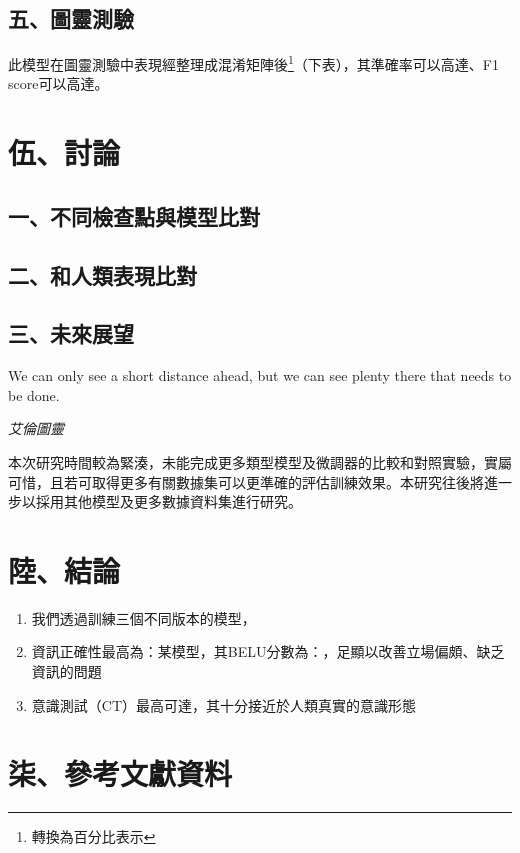 \documentclass[8pt,a4paper,新細明體,UTF8,natbib]{article}
\begin{document}
\begin{CJK*}{UTF8}{bsmi}
	\subsection{五、圖靈測驗}
	此模型在圖靈測驗中表現經整理成混淆矩陣後\footnote{轉換為百分比表示}（下表），其準確率可以高達、F1 score可以高達。

	\section{伍、討論}

	\subsection{一、不同檢查點與模型比對}
	\subsection{二、和人類表現比對}
	\subsection{三、未來展望}
	\epigraph{	We can only see a short distance ahead, but we can see plenty there that needs to be done.}{\textit{艾倫圖靈}}
	本次研究時間較為緊湊，未能完成更多類型模型及微調器的比較和對照實驗，實屬可惜，且若可取得更多有關數據集可以更準確的評估訓練效果。本研究往後將進一步以採用其他模型及更多數據資料集進行研究。

	\section{陸、結論}
		\begin{enumerate}
			\item 我們透過訓練三個不同版本的模型，
			\item 資訊正確性最高為：某模型，其BELU分數為：，足顯以改善立場偏頗、缺乏資訊的問題
			\item 意識測試（CT）最高可達，其十分接近於人類真實的意識形態
		\end{enumerate}
	\section{柒、參考文獻資料}
	
	\renewcommand{\refname}{}
	
\end{CJK*}
\end{document}
